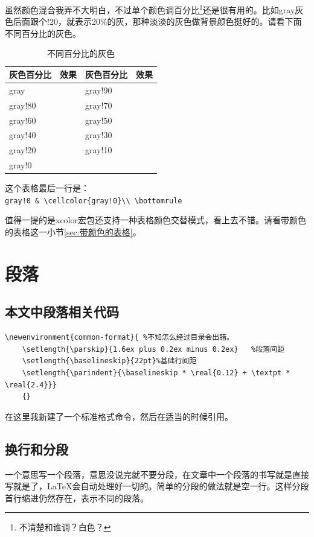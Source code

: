 \documentclass[11pt,oneside]{book}
\newlength{\textpt}
\begin{document}
\begin{common-format}
虽然颜色混合我弄不大明白，不过单个颜色调百分比\footnote{不清楚和谁调？白色？}还是很有用的。比如gray灰色后面跟个!20，就表示20\%的灰，那种淡淡的灰色做背景颜色挺好的。请看下面不同百分比的灰色。
\begin{table}[H]
\begin{tabular}{@{}lp{50pt}lp{50pt}@{}}
\toprule
灰色百分比        & 效果  & 灰色百分比       & 效果\\ \midrule
gray     &  \cellcolor{gray}  & gray!90     &    \cellcolor{gray!90} \\
gray!80      &   \cellcolor{gray!80} & gray!70    &   \cellcolor{gray!70}\\
gray!60     &  \cellcolor{gray!60}  & gray!50      &   \cellcolor{gray!50}\\
gray!40      &   \cellcolor{gray!40} & gray!30    &   \cellcolor{gray!30}\\
gray!20  &  \cellcolor{gray!20} &gray!10       &   \cellcolor{gray!10}  \\
gray!0    &    \cellcolor{gray!0}\\ \bottomrule
\end{tabular}
\label{tab:不同百分比的灰色}
\caption{不同百分比的灰色}
\end{table}

这个表格最后一行是：\\
\verb+gray!0 & \cellcolor{gray!0}\\ \bottomrule+

值得一提的是xcolor宏包还支持一种表格颜色交替模式，看上去不错。请看带颜色的表格这一小节\ref{sec:带颜色的表格}。


\section{段落}
\subsection{本文中段落相关代码}
\begin{Verbatim}
\newenvironment{common-format}{ %不知怎么经过目录会出错。
	\setlength{\parskip}{1.6ex plus 0.2ex minus 0.2ex}   %段落间距
	\setlength{\baselineskip}{22pt}%基础行间距
	\setlength{\parindent}{\baselineskip * \real{0.12} + \textpt * \real{2.4}}}  
    {}
\end{Verbatim}
在这里我新建了一个标准格式命令，然后在适当的时候引用。

\subsection{换行和分段}
一个意思写一个段落，意思没说完就不要分段，在文章中一个段落的书写就是直接写就是了，\LaTeX 会自动处理好一切的。简单的分段的做法就是空一行。这样分段首行缩进仍然存在，表示不同的段落。


\end{common-format}
\end{document}
